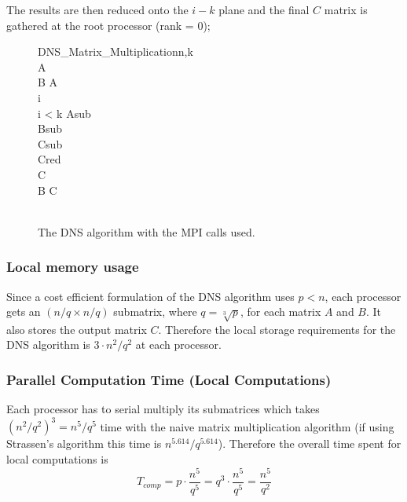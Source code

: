 \documentclass{article}
\begin{document}
The results are then reduced onto the $i-k$ plane and the final $C$ matrix is
gathered at the root processor (rank = 0);

\begin{figure}

\begin{pseudocode}[ruled]{DNS\_Matrix\_Multiplication}{n,k}
 \\
A \GETS {} \\
B \GETS A \\
i  \\

\WHILE i < k \DO
\BEGIN
	Asub \GETS {} \\
	Bsub \GETS {} \\
	Csub \GETS {} \\
	
	Cred \GETS {} \\
	C \GETS {} \\

	B \GETS C \\
\END \vspace{10pt} \\

\end{pseudocode}
\caption{The DNS algorithm with the MPI calls used.}
\end{figure}


\subsubsection{Local memory usage}

Since a cost efficient formulation of the DNS algorithm uses $p < n$, each
processor gets an $(n/q \times n/q)$ submatrix, where $q = \sqrt[3]{p}$, for
each matrix $A$ and $B$.  It also stores the output matrix $C$.  Therefore the
local storage requirements for the DNS algorithm is $3 \cdot n^2 / q^2$ at each
processor.

\subsubsection{Parallel Computation Time (Local Computations)}

Each processor has to serial multiply its submatrices which takes $(n^2/q^2)^3 =
n^5/q^5$ time with the naive matrix multiplication algorithm (if using
Strassen's algorithm this time is $n^{5.614}/q^{5.614}$).  Therefore the
overall time spent for local computations is $$T_{{comp}} = p\cdot
\frac{n^5}{q^5} = q^3 \cdot \frac{n^5}{q^5} = \frac{n^5}{q^2}$$
\end{document}

